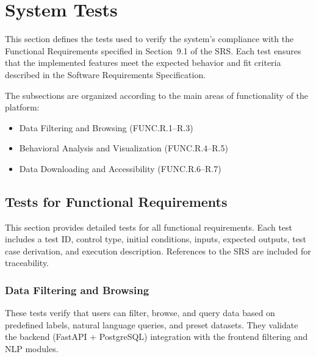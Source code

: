 \documentclass[12pt, titlepage]{article}
\begin{document}
\section{System Tests}
\label{sec:system_tests}

This section defines the tests used to verify the system’s compliance with the
Functional Requirements specified in Section~9.1 of the SRS. Each test ensures
that the implemented features meet the expected behavior and fit criteria
described in the Software Requirements Specification. 

The subsections are organized according to the main areas of functionality of
the platform:
\begin{itemize}
    \item Data Filtering and Browsing (FUNC.R.1--R.3)
    \item Behavioral Analysis and Visualization (FUNC.R.4--R.5)
    \item Data Downloading and Accessibility (FUNC.R.6--R.7)
\end{itemize}

\subsection{Tests for Functional Requirements}

This section provides detailed tests for all functional requirements. Each test
includes a test ID, control type, initial conditions, inputs, expected outputs,
test case derivation, and execution description. References to the SRS are
included for traceability. 

\subsubsection{Data Filtering and Browsing}

These tests verify that users can filter, browse, and query data based on
predefined labels, natural language queries, and preset datasets. They validate
the backend (FastAPI + PostgreSQL) integration with the frontend filtering and
NLP modules.
\end{document}
